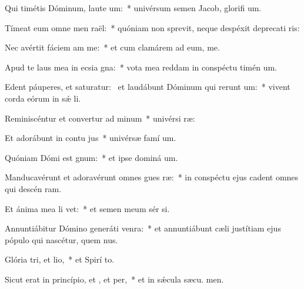 \item Qui timétis Dóminum, laute um:~* univérsum semen Jacob, glorifi um.
\item Tímeat eum omne men raël:~* quóniam non sprevit, neque despéxit deprecati ris:
\item Nec avértit fáciem am  me:~* et cum clamárem ad eum,  me.
\item Apud te laus mea in ecsia gna:~* vota mea reddam in conspéctu timén um.
\item Edent páuperes, et saturatur:~\pscross{} et laudábunt Dóminum qui rerunt um:~* vivent corda eórum in sǽ li.
\item Reminiscéntur et convertur ad minum~* univérsi  ræ:
\item Et adorábunt in contu jus~* univérsæ famí um.
\item Quóniam Dómi est gnum:~* et ipse dominá um.
\item Manducavérunt et adoravérunt omnes gues ræ:~* in conspéctu ejus cadent omnes qui descén  ram.
\item Et ánima mea li vet:~* et semen meum sér si.
\item Annuntiábitur Dómino generáti venra:~* et annuntiábunt cæli justítiam ejus pópulo qui nascétur, quem  nus.
\item Glória tri, et lio,~* et Spirí to.
\item Sicut erat in princípio, et , et per,~* et in sǽcula sæcu. men.
